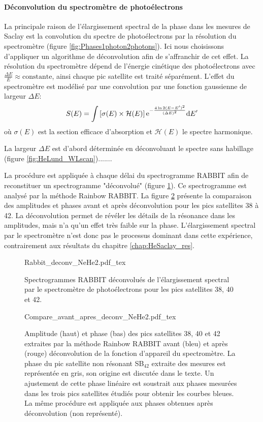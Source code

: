 \paragraph*{Déconvolution du spectromètre de photoélectrons} La principale raison de l'élargissement spectral de la phase dans les mesures de Saclay est la convolution du spectre de photoélectrons par la résolution du spectromètre (figure \ref{fig:Phases1photon2photons}). Ici nous choisissons d'appliquer un algorithme de déconvolution afin de s'affranchir de cet effet. La résolution du spectromètre dépend de l'énergie cinétique des photoélectrons avec $\frac{\Delta E}{E} \approx \text{constante}$, ainsi chaque pic satellite est traité séparément. L'effet du spectromètre est modélisé par une convolution par une fonction gaussienne de largeur $\Delta E$:
\begin{equation}
S(E) = \int \left[ \sigma(E) \times \mathcal{H} (E) \right] \mathrm{e}^{-\frac{4 \ln 2 (E-E')^2}{(\Delta E)^2}} \mathrm{d} E'
\end{equation}
où $\sigma(E)$ est la section efficace d'absorption et $\mathcal{H}(E)$ le spectre harmonique.

La largeur $\Delta E$ est d'abord déterminée en déconvoluant le spectre sans habillage (figure \ref{fig:HeLund_WLscan}).......

La procédure est appliquée à chaque délai du spectrogramme RABBIT afin de reconstituer un spectrogramme "déconvolué" (figure \ref{fig:Rabbit_HeLund_2s2p_deconv}). Ce spectrogramme est analysé par la méthode Rainbow RABBIT. La figure \ref{fig:Resultats_NeHe2_deconv} présente la comparaison des amplitudes et phases avant et après déconvolution pour les pics satellites 38 à 42. La déconvolution permet de révéler les détails de la résonance dans les amplitudes, mais n'a qu'un effet très faible sur la phase. L'élargissement spectral par le spectromètre n'est donc pas le processus dominant dans cette expérience, contrairement aux résultats du chapitre \ref{chap:HeSaclay_res}. 

\begin{figure}
\centering
\def\svgwidth{0.95\textwidth}
{Rabbit_deconv_NeHe2.pdf_tex}
\caption{Spectrogrammes RABBIT déconvolués de l'élargissement spectral par le spectromètre de photoélectrons pour les pics satellites 38, 40 et 42.}
\label{fig:Rabbit_HeLund_2s2p_deconv}
\end{figure}

\begin{figure}
\centering
\def\svgwidth{\textwidth}
{Compare_avant_apres_deconv_NeHe2.pdf_tex}
\caption{Amplitude (haut) et phase (bas) des pics satellites 38, 40 et 42 extraites par la méthode Rainbow RABBIT avant (bleu) et après (rouge) déconvolution de la fonction d'appareil du spectromètre. La phase du pic satellite non résonant SB$_{42}$ extraite des mesures est représentée en gris, son origine est discutée dans le texte. Un ajustement de cette phase linéaire est soustrait aux phases mesurées dans les trois pics satellites étudiés pour obtenir les courbes bleues. La même procédure est appliquée aux phases obtenues après déconvolution (non représenté).}
\label{fig:Resultats_NeHe2_deconv}
\end{figure}

